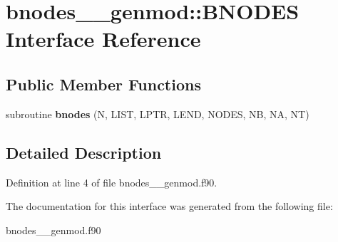 \hypertarget{interfacebnodes____genmod_1_1_b_n_o_d_e_s}{\section{bnodes\+\_\+\+\_\+genmod\+:\+:B\+N\+O\+D\+E\+S Interface Reference}
\label{interfacebnodes____genmod_1_1_b_n_o_d_e_s}
}
\subsection*{Public Member Functions}
\begin{DoxyCompactItemize}
\item 
\hypertarget{interfacebnodes____genmod_1_1_b_n_o_d_e_s_ae315cc7a70bda93d76484f8849304bca}{subroutine {\bfseries bnodes} (N, L\+I\+S\+T, L\+P\+T\+R, L\+E\+N\+D, N\+O\+D\+E\+S, N\+B, N\+A, N\+T)}\label{interfacebnodes____genmod_1_1_b_n_o_d_e_s_ae315cc7a70bda93d76484f8849304bca}

\end{DoxyCompactItemize}


\subsection{Detailed Description}


Definition at line 4 of file bnodes\+\_\+\+\_\+genmod.\+f90.



The documentation for this interface was generated from the following file\+:\begin{DoxyCompactItemize}
\item 
bnodes\+\_\+\+\_\+genmod.\+f90\end{DoxyCompactItemize}
